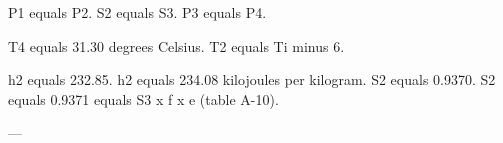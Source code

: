 P1 equals P2.  
S2 equals S3.  
P3 equals P4.  

T4 equals 31.30 degrees Celsius.  
T2 equals Ti minus 6.  

h2 equals 232.85.  
h2 equals 234.08 kilojoules per kilogram.  
S2 equals 0.9370.  
S2 equals 0.9371 equals S3 x f x e (table A-10).  

---
